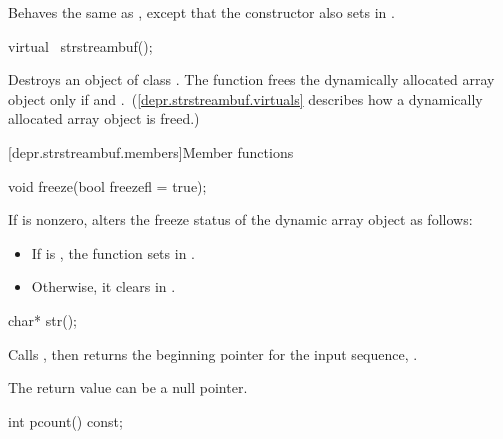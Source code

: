\begin{itemdescr}
\pnum
\effects
Behaves the same as
,
except that the constructor also sets  in .
\end{itemdescr}

%
\begin{itemdecl}
virtual ~strstreambuf();
\end{itemdecl}

\begin{itemdescr}
\pnum
\effects
Destroys an object of class
.
The function frees the dynamically allocated array object only if
and
.~(\ref{depr.strstreambuf.virtuals} describes how a dynamically allocated array object is freed.)
\end{itemdescr}

[depr.strstreambuf.members]{Member functions}

%
\begin{itemdecl}
void freeze(bool freezefl = true);
\end{itemdecl}

\begin{itemdescr}
\pnum
\effects
If  is nonzero, alters the
freeze status of the dynamic array object as follows:
\begin{itemize}
\item
If  is
,
the function sets  in .
\item
Otherwise, it clears  in .
\end{itemize}
\end{itemdescr}

%
\begin{itemdecl}
char* str();
\end{itemdecl}

\begin{itemdescr}
\pnum
\effects
Calls
,
then returns the beginning pointer for the input sequence, .

\pnum
\remarks
The return value can be a null pointer.
\end{itemdescr}

%
\begin{itemdecl}
int pcount() const;
\end{itemdecl}

